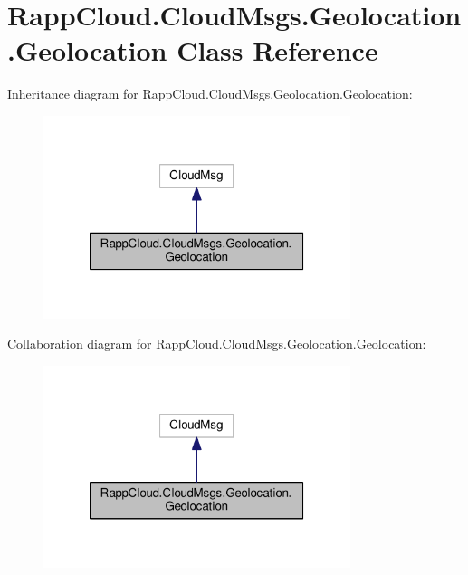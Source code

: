 \hypertarget{classRappCloud_1_1CloudMsgs_1_1Geolocation_1_1Geolocation}{\section{Rapp\-Cloud.\-Cloud\-Msgs.\-Geolocation.\-Geolocation Class Reference}
\label{classRappCloud_1_1CloudMsgs_1_1Geolocation_1_1Geolocation}
}


Inheritance diagram for Rapp\-Cloud.\-Cloud\-Msgs.\-Geolocation.\-Geolocation\-:
\nopagebreak
\begin{figure}[H]
\begin{center}
\leavevmode
\includegraphics[width=254pt]{classRappCloud_1_1CloudMsgs_1_1Geolocation_1_1Geolocation__inherit__graph}
\end{center}
\end{figure}


Collaboration diagram for Rapp\-Cloud.\-Cloud\-Msgs.\-Geolocation.\-Geolocation\-:
\nopagebreak
\begin{figure}[H]
\begin{center}
\leavevmode
\includegraphics[width=254pt]{classRappCloud_1_1CloudMsgs_1_1Geolocation_1_1Geolocation__coll__graph}
\end{center}
\end{figure}
